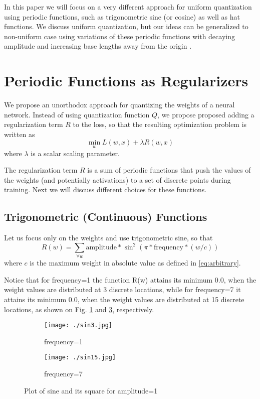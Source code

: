 \documentclass{article}
\newcommand{\squeeze}{\vspace{-2.5mm}}
\begin{document}
In this paper we will focus on a very different approach for uniform quantization using periodic functions, such as trigonometric sine (or cosine) as well as hat functions. We discuss uniform quantization, but our ideas can be generalized to non-uniform case using variations of these periodic functions with decaying amplitude and increasing base lengths away from the origin \cite{Stenger1993,Strang2008}. 

\section{Periodic Functions as Regularizers} 

We propose an unorthodox approach for quantizing the weights of a neural network. Instead of using quantization function $Q$, we propose proposed adding a regularization term $R$ to the loss, so that the resulting optimization problem is written as
\begin{equation}
\min_w L(w,x) + \lambda R(w,x) 
\label{eq:orig_reg}
\end{equation}
where $\lambda$ is a scalar scaling parameter.

The regularization term $R$ is a sum of periodic functions that push the values of the weights (and potentially activations) to a set of discrete points during training. Next we will discuss different choices for these functions. 

\subsection{Trigonometric (Continuous) Functions}
Let us focus only on the weights and use trigonometric sine, so that 
\begin{equation}
R(w) = \sum_{\forall w} \text{amplitude} * \sin^2 (\pi * \text{frequency} * (w/c)) 
\label{eq:sin_con}
\end{equation}
where $c$ is the maximum weight in absolute value as defined in \eqref{eq:arbitrary}.

Notice that for frequency=1 the function R(w) attains its minimum 0.0, when the weight values are distributed at 3 discrete locations, while for frequency=7 it attains its minimum 0.0, when the weight values are distributed at 15 discrete locations, as shown on Fig. \ref{fig:sin3} and \ref{fig:sin15}, respectively.

\begin{figure}[h]
 \begin{center}
  \begin{subfigure}[b]{0.49\textwidth} 
   \texttt{[image: ./sin3.jpg]}
   \caption{frequency=1}
   \label{fig:sin3}
  \end{subfigure} 
  \begin{subfigure}[b]{0.49\textwidth}
   \texttt{[image: ./sin15.jpg]}
   \caption{frequency=7}
   \label{fig:sin15}
  \end{subfigure}
  \caption{Plot of sine and its square for amplitude=1}
  \squeeze \squeeze
 \end{center}
\end{figure}
\end{document}
